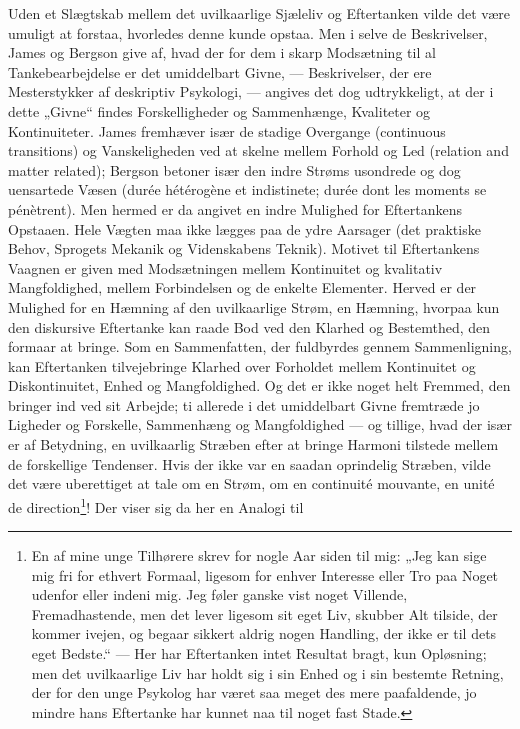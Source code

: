 \documentclass[12pt,a4paper]{book}
\newcommand{\opage}[1]{\marginnote{\footnotesize\textit{[#1]}}}
\begin{document}
Uden et Slægtskab mellem det uvilkaarlige Sjæleliv og Eftertanken
vilde det være umuligt at forstaa, hvorledes denne kunde opstaa. Men i
selve de Beskrivelser, James og Bergson give af, hvad der for dem i
skarp Modsætning til al Tankebearbejdelse er det umiddelbart Givne,
--- Beskrivelser, der ere Mesterstykker af deskriptiv Psykologi, ---
angives det dog udtrykkeligt, at der i dette „Givne“ findes
Forskelligheder og Sammenhænge, Kvaliteter og Kontinuiteter. James
fremhæver især de stadige Overgange (continuous transitions) og
Vanskeligheden ved at skelne mellem Forhold og Led (relation and
matter related); Bergson betoner især den indre Strøms usondrede og
dog uensartede Væsen (durée hétérogène et indistinete; durée dont les
moments se pénètrent). Men hermed er da angivet en indre Mulighed for
Eftertankens Opstaaen. Hele Vægten maa ikke lægges paa de ydre
Aarsager (det praktiske Behov, Sprogets Mekanik og Videnskabens
Teknik). Motivet til Eftertankens Vaagnen er given med Modsætningen
mellem Kontinuitet og kvalitativ Mangfoldighed, mellem Forbindelsen og
de enkelte Elementer. Herved er der Mulighed for en Hæmning af den
uvilkaarlige Strøm, en Hæmning, hvorpaa kun den diskursive Eftertanke
kan raade Bod ved den Klarhed og Bestemthed, den formaar at bringe.
Som en Sammenfatten, der fuldbyrdes gennem Sammenligning, kan
Eftertanken tilvejebringe Klarhed over Forholdet mellem Kontinuitet og
Diskontinuitet, Enhed og Mangfoldighed. Og det er ikke noget helt
Fremmed, den bringer ind ved sit Arbejde; ti allerede i det
umiddelbart Givne fremtræde jo Ligheder og Forskelle, Sammenhæng og
Mangfoldighed --- og tillige, hvad der især \opage{10} er af Betydning, en
uvilkaarlig Stræben efter at bringe Harmoni tilstede mellem de
forskellige Tendenser. Hvis der ikke var en saadan oprindelig Stræben,
vilde det være uberettiget at tale om en Strøm, om en continuité
mouvante, en unité de direction\footnote{En af mine unge Tilhørere
skrev for nogle Aar siden til mig: „Jeg kan sige mig fri for ethvert
Formaal, ligesom for enhver Interesse eller Tro paa Noget udenfor
eller indeni mig. Jeg føler ganske vist noget Villende,
Fremadhastende, men det lever ligesom sit eget Liv, skubber Alt
tilside, der kommer ivejen, og begaar sikkert aldrig nogen Handling,
der ikke er til dets eget Bedste.“ --- Her har Eftertanken intet
Resultat bragt, kun Opløsning; men det uvilkaarlige Liv har holdt sig
i sin Enhed og i sin bestemte Retning, der for den unge Psykolog har
været saa meget des mere paafaldende, jo mindre hans Eftertanke har
kunnet naa til noget fast Stade.}! Der viser sig da her en Analogi til
\end{document}
